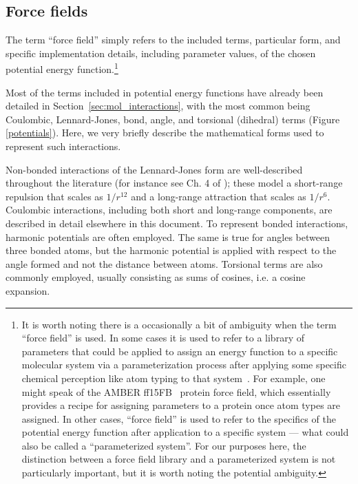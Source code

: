 \documentclass[9pt,bestpractices]{livecoms}
\begin{document}
\subsection{Force fields}
\label{sec:force_fields}

The term ``force field'' simply refers to the included terms, particular form, and specific implementation details, including parameter values, of the chosen potential energy function.\footnote{It is worth noting there is a occasionally a bit of ambiguity when the term ``force field'' is used.
In some cases it is used to refer to a library of parameters that could be applied to assign an energy function to a specific molecular system via a parameterization process after applying some specific chemical perception like atom typing to that system~\cite{Mobley:2018:bioRxiv}.
For example, one might speak of the AMBER ff15FB~\citep{amber15FB} protein force field, which essentially provides a recipe for assigning parameters to a protein once atom types are assigned.
In other cases, ``force field'' is used to refer to the specifics of the potential energy function after application to a specific system --- what could also be called a ``parameterized system''.
For our purposes here, the distinction between a force field library and a parameterized system is not particularly important, but it is worth noting the potential ambiguity. }

Most of the terms included in potential energy functions have already been detailed in Section~\ref{sec:mol_interactions}, with the most common being Coulombic, Lennard-Jones, bond, angle, and torsional (dihedral) terms (Figure \ref{potentials}).
Here, we very briefly describe the mathematical forms used to represent such interactions.

Non-bonded interactions of the Lennard-Jones form are well-described throughout the literature (for instance see Ch. 4 of \citet{LeachBook}); these model a short-range repulsion that scales as $1/r^{12}$ and a long-range attraction that scales as $1/r^6$.
Coulombic interactions, including both short and long-range components, are described in detail elsewhere in this document.
To represent bonded interactions, harmonic potentials are often employed.
The same is true for angles between three bonded atoms, but the harmonic potential is applied with respect to the angle formed and not the distance between atoms.
Torsional terms are also commonly employed, usually consisting as sums of cosines, i.e. a cosine expansion.
\end{document}
